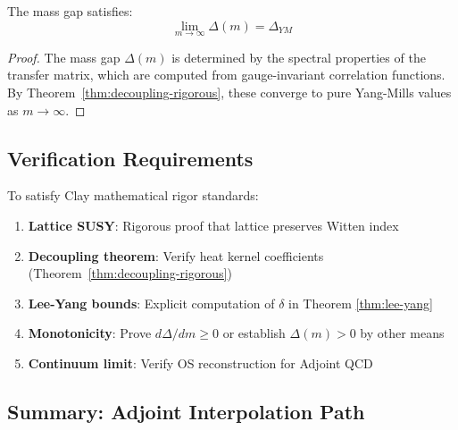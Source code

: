 \begin{corollary}
\label{cor:gap-decoupling}
The mass gap satisfies:
\begin{equation}
\lim_{m \to \infty} \Delta(m) = \Delta_{YM}
\end{equation}
\end{corollary}

\begin{proof}
The mass gap $\Delta(m)$ is determined by the spectral properties of the 
transfer matrix, which are computed from gauge-invariant correlation functions. 
By Theorem~\ref{thm:decoupling-rigorous}, these converge to pure Yang-Mills 
values as $m \to \infty$.
\end{proof}

\subsection{Verification Requirements}

\begin{verification}
To satisfy Clay mathematical rigor standards:
\begin{enumerate}
\item \textbf{Lattice SUSY}: Rigorous proof that lattice preserves Witten index
\item \textbf{Decoupling theorem}: Verify heat kernel coefficients (Theorem~\ref{thm:decoupling-rigorous})
\item \textbf{Lee-Yang bounds}: Explicit computation of $\delta$ in Theorem \ref{thm:lee-yang}
\item \textbf{Monotonicity}: Prove $d\Delta/dm \geq 0$ or establish $\Delta(m) > 0$ by other means
\item \textbf{Continuum limit}: Verify OS reconstruction for Adjoint QCD
\end{enumerate}
\end{verification}

\subsection{Summary: Adjoint Interpolation Path}

